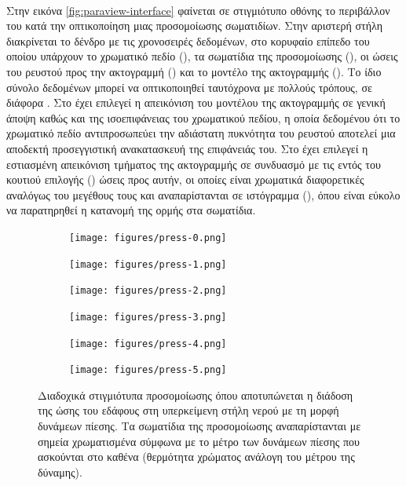\paragraph{} Στην εικόνα \ref{fig:paraview-interface} φαίνεται σε στιγμιότυπο οθόνης το
περιβάλλον του  κατά την οπτικοποίηση μιας προσομοίωσης 
σωματιδίων. Στην αριστερή στήλη διακρίνεται το δένδρο με τις χρονοσειρές δεδομένων, στο
κορυφαίο επίπεδο του οποίου υπάρχουν το χρωματικό πεδίο (), τα σωματίδια
της προσομοίωσης (), οι ώσεις του ρευστού προς την ακτογραμμή
() και το μοντέλο της ακτογραμμής (). Το ίδιο
σύνολο δεδομένων μπορεί να οπτικοποιηθεί ταυτόχρονα με πολλούς τρόπους, σε διάφορα
. Στο  έχει επιλεγεί η απεικόνιση του μοντέλου της
ακτογραμμής σε γενική άποψη καθώς και της ισοεπιφάνειας του χρωματικού πεδίου, η οποία
δεδομένου ότι το χρωματικό πεδίο αντιπροσωπεύει την αδιάστατη πυκνότητα του ρευστού
αποτελεί μια αποδεκτή προσεγγιστική ανακατασκευή της επιφάνειάς του. Στο 
έχει επιλεγεί η εστιασμένη απεικόνιση τμήματος της ακτογραμμής σε συνδυασμό με τις εντός
του κουτιού επιλογής () ώσεις προς αυτήν, οι οποίες είναι χρωματικά διαφορετικές
αναλόγως του μεγέθους τους και αναπαρίστανται σε ιστόγραμμα (), όπου
είναι εύκολο να παρατηρηθεί η κατανομή της ορμής στα σωματίδια.

\begin{figure}[h]
  \begin{subfigure}{.5\textwidth}
    \centering
    \texttt{[image: figures/press-0.png]}
  \end{subfigure}
  \begin{subfigure}{.5\textwidth}
    \centering
    \texttt{[image: figures/press-1.png]}
  \end{subfigure}
  \begin{subfigure}{.5\textwidth}
    \centering
    \texttt{[image: figures/press-2.png]}
  \end{subfigure}
  \begin{subfigure}{.5\textwidth}
    \centering
    \texttt{[image: figures/press-3.png]}
  \end{subfigure}
  \begin{subfigure}{.5\textwidth}
    \centering
    \texttt{[image: figures/press-4.png]}
  \end{subfigure}
  \begin{subfigure}{.5\textwidth}
    \centering
    \texttt{[image: figures/press-5.png]}
  \end{subfigure}
  \caption[Διάδοση δυνάμεων πίεσης]{Διαδοχικά στιγμιότυπα προσομοίωσης όπου αποτυπώνεται η
    διάδοση της ώσης του εδάφους στη υπερκείμενη στήλη νερού με τη μορφή δυνάμεων
    πίεσης. Τα σωματίδια της προσομοίωσης αναπαρίστανται με σημεία χρωματισμένα σύμφωνα με
    το μέτρο των δυνάμεων πίεσης που ασκούνται στο καθένα (θερμότητα χρώματος ανάλογη του
    μέτρου της δύναμης).}
  \label{fig:pressure-forces}
\end{figure}

